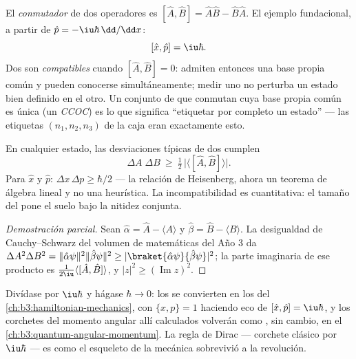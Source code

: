 \begin{definition}\label{def:b3:quantum-formalism:commutator}
El \emph{conmutador} de dos operadores es $[\hat A, \hat B] = \hat
A\hat B - \hat B\hat A$. El ejemplo fundacional, a partir de $\hat p =
-\iu\hbar\,\dd/\dd x$:
\[
[\hat x, \hat p] = \iu\hbar .
\]
Dos  son \emph{compatibles} cuando $[\hat A, \hat B] = 0$:
admiten entonces una base propia común y pueden conocerse simultáneamente;
medir uno no perturba un estado bien definido en el otro. Un conjunto de
 que conmutan cuya base propia común es única (un
\emph{CCOC}) es lo que significa ``etiquetar por completo un estado'' ---
las etiquetas $(n_1, n_2, n_3)$ de la caja eran exactamente esto.
\end{definition}

\begin{theorem}\label{thm:b3:quantum-formalism:uncertainty}
En cualquier estado, las desviaciones típicas de dos  cumplen
\[
\Delta A\;\Delta B \ \ge\ \tfrac12\,\big|\langle[\hat A, \hat
B]\rangle\big| .
\]
Para $\hat x$ y $\hat p$: $\Delta x\,\Delta p \ge \hbar/2$ ---
la relación de Heisenberg, ahora un teorema de álgebra lineal y no una
heurística. La incompatibilidad es cuantitativa: el tamaño del 
pone el suelo bajo la nitidez conjunta.
\end{theorem}

\begin{proof}[Demostración parcial]
Sean $\hat\alpha = \hat A - \langle A\rangle$ y $\hat\beta = \hat B -
\langle B\rangle$. La desigualdad de Cauchy--Schwarz del volumen de
matemáticas del Año 3 da $\Delta A^2\Delta B^2 =
\|\hat\alpha\psi\|^2\|\hat\beta\psi\|^2 \ge
|\braket{\hat\alpha\psi}{\hat\beta\psi}|^2$; la parte imaginaria de
ese producto es $\tfrac1{2\iu}\langle[\hat A, \hat B]\rangle$, y
$|z|^2 \ge (\operatorname{Im}z)^2$.
\end{proof}

\begin{remark}\label{rem:b3:quantum-formalism:poisson}
Divídase por $\iu\hbar$ y hágase $\hbar \to 0$: los  se
convierten en los  del
\cref{ch:b3:hamiltonian-mechanics}, con $\{x, p\} =
1$ haciendo eco de $[\hat x, \hat p] = \iu\hbar$, y los corchetes del
momento angular allí calculados volverán como , sin cambio, en
el \cref{ch:b3:quantum-angular-momentum}. La regla de Dirac --- corchete
clásico por $\iu\hbar$ --- es como el esqueleto de la mecánica sobrevivió a
la revolución.
\end{remark}

